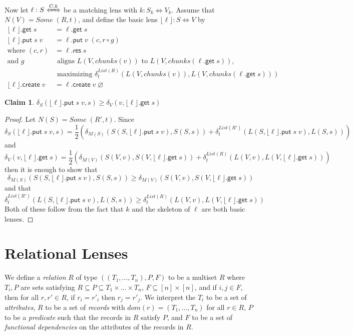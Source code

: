 \documentclass[acmsmall,review,anonymous]{acmart}\settopmatter{printfolios=true,printccs=false,printacmref=false}
\theoremstyle{definition}
\newtheorem{claim}{Claim}
\newcommand{\kw}[1]{\ensuremath{\mathsf{#1}}\xspace}
\newcommand{\get}{\ensuremath{\kw{get}}\xspace}
\newcommand{\pput}{\ensuremath{\kw{put}}\xspace}
\newcommand{\create}{\ensuremath{\kw{create}}\xspace}
\newcommand{\res}{\ensuremath{\kw{res}}\xspace}
\begin{document}
Now let $\ell : S \xLeftrightarrow{C, k}$ be a matching lens with $k : S_k \Leftrightarrow V_k$.
Assume that $N(V) = Some \; (R, t)$, and define the basic lens $\lfloor \ell \rfloor : S \Leftrightarrow V$ by
\begin{align*}
\lfloor \ell \rfloor.\get \; s &= \ell.\get \; s\\
\lfloor \ell \rfloor.\pput \; s \; v&= \ell.\pput \; v \; (c, r \circ g)\\
\text{where } (c, r) &= \ell.\res \;s \\
\text{and } g &\text{ aligns } L(V, chunks(v)) \text{ to } L(V, chunks(\ell.\get \; s)),\\
&\text{ maximizing } \delta^{List(R)}_{t}(L(V, chunks(v)), L(V, chunks(\ell.\get \; s)))\\
\lfloor \ell \rfloor.\create \; v &= \ell.\create \; v \; \varnothing
\end{align*}
\begin{claim}
$\delta_S(\lfloor \ell \rfloor.\pput \; s \;v, s) \geq \delta_V(v, \lfloor \ell \rfloor.\get \; s)$
\end{claim}
\begin{proof}
Let $N(S) = Some \; (R', t)$. Since $$\delta_S(\lfloor \ell \rfloor.\pput \; s \;v, s) = \frac{1}{2} \left(\delta_{M(S)}(S(S,\lfloor \ell \rfloor.\pput \; s \;v), S(S,s)) + \delta^{List(R')}_{t}(L(S, \lfloor \ell \rfloor.\pput \; s \;v), L(S, s))\right)$$
and
$$\delta_V(v, \lfloor \ell \rfloor.\get \; s) = \frac{1}{2} \left(\delta_{M(V)}(S(V,v), S(V,\lfloor \ell \rfloor.\get \; s)) + \delta^{List(R)}_{t}(L(V, v), L(V, \lfloor \ell \rfloor.\get \; s))\right)$$
then it is enough to show that
$$\delta_{M(S)}(S(S,\lfloor \ell \rfloor.\pput \; s \;v), S(S,s)) \geq \delta_{M(V)}(S(V,v), S(V,\lfloor \ell \rfloor.\get \; s))$$
and that
$$\delta^{List(R')}_{t}(L(S, \lfloor \ell \rfloor.\pput \; s \;v), L(S, s)) \geq \delta^{List(R)}_{t}(L(V, v), L(V, \lfloor \ell \rfloor.\get \; s))$$
Both of these follow from the fact that $k$ and the skeleton of $\ell$ are both basic lenses.
\end{proof}
\iffalse
\section{Relational Lenses}
We define a {\em relation} $R$ of type $((T_1, \ldots, T_n), P, F)$ to be a
multiset $R$ where $T_i, P$ are sets satisfying $R \subseteq P \subseteq T_1
\times \ldots \times T_n$, $F \subseteq [n] \times [n]$, and if $i, j \in F$,
then for all $r, r' \in R$, if $r_i = r'_i$ then $r_j = r'_j$. We interpret the
$T_i$ to be a set of {\em attributes}, $R$ to be a set of {\em records} with
$dom(r) = (T_1, \ldots, T_n)$ for all $r \in R$, $P$ to be a {\em predicate}
such that the records in $R$ satisfy $P$, and $F$ to be a set of {\em
functional dependencies} on the attributes of the records in $R$.
\end{document}
